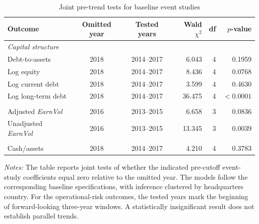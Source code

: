 \begin{table}[htbp]
    \caption{Joint pre-trend tests for baseline event studies}
    \label{tab:appendix_baseline_pretrends}
    \centering
    \small
    \begin{tabular}{lccrrr}
        \toprule
        Outcome & Omitted year & Tested years & Wald \(\chi^2\) & df & \(p\)-value \\
        \midrule
        \multicolumn{6}{l}{\textit{Capital structure}} \\
        Debt-to-assets & 2018 & 2014--2017 & 6.043 & 4 & 0.1959 \\
        Log equity & 2018 & 2014--2017 & 8.436 & 4 & 0.0768 \\
        Log current debt & 2018 & 2014--2017 & 3.599 & 4 & 0.4630 \\
        Log long-term debt & 2018 & 2014--2017 & 36.475 & 4 & \(<0.0001\) \\
        \addlinespace
        \multicolumn{6}{l}{\textit{Operational risk}} \\
        Adjusted \textit{EarnVol} & 2016 & 2013--2015 & 6.658 & 3 & 0.0836 \\
        Unadjusted \textit{EarnVol} & 2016 & 2013--2015 & 13.345 & 3 & 0.0039 \\
        \addlinespace
        \multicolumn{6}{l}{\textit{Cash holdings}} \\
        Cash/assets & 2018 & 2014--2017 & 4.210 & 4 & 0.3783 \\
        \bottomrule
    \end{tabular}

    \parbox{\textwidth}{\vspace{0.35em}\footnotesize\textit{Notes:} The table reports joint tests of whether the indicated pre-cutoff event-study coefficients equal zero relative to the omitted year. The models follow the corresponding baseline specifications, with inference clustered by headquarters country. For the operational-risk outcomes, the tested years mark the beginning of forward-looking three-year windows. A statistically insignificant result does not establish parallel trends.}
\end{table}

